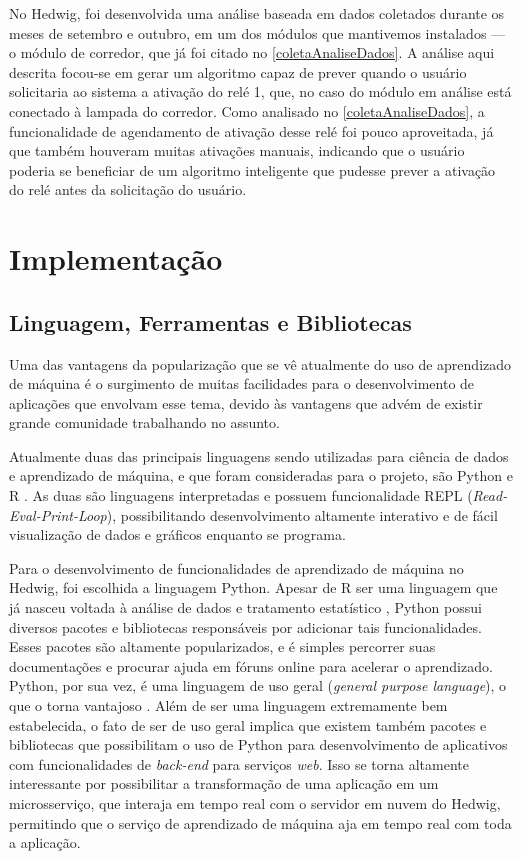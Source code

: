 		No Hedwig, foi desenvolvida uma análise baseada em dados coletados durante os meses de setembro e outubro, em um dos módulos que mantivemos instalados --- o módulo de corredor, que já foi citado no \ref{coletaAnaliseDados}. A análise aqui descrita focou-se em gerar um algoritmo capaz de prever quando o usuário solicitaria ao sistema a ativação do relé 1, que, no caso do módulo em análise está conectado à lampada do corredor. Como analisado no \ref{coletaAnaliseDados}, a funcionalidade de agendamento de ativação desse relé foi pouco aproveitada, já que também houveram muitas ativações manuais, indicando que o usuário poderia se beneficiar de um algoritmo inteligente que pudesse prever a ativação do relé antes da solicitação do usuário.

	\section{Implementação}

		\subsection{Linguagem, Ferramentas e Bibliotecas}

			Uma das vantagens da popularização que se vê atualmente do uso de aprendizado de máquina é o surgimento de muitas facilidades para o desenvolvimento de aplicações que envolvam esse tema, devido às vantagens que advém de existir grande comunidade trabalhando no assunto.

			Atualmente duas das principais linguagens sendo utilizadas para ciência de dados e aprendizado de máquina, e que foram consideradas para o projeto, são Python e R \cite{languagesForML}. As duas são linguagens interpretadas e possuem funcionalidade REPL (\emph{Read-Eval-Print-Loop}), possibilitando desenvolvimento altamente interativo e de fácil visualização de dados e gráficos enquanto se programa.

			Para o desenvolvimento de funcionalidades de aprendizado de máquina no Hedwig, foi escolhida a linguagem Python. Apesar de R ser uma linguagem que já nasceu voltada à análise de dados e tratamento estatístico \cite{rLanguage}, Python possui diversos pacotes e bibliotecas responsáveis por adicionar tais funcionalidades. Esses pacotes são altamente popularizados, e é simples percorrer suas documentações e procurar ajuda em fóruns online para acelerar o aprendizado. Python, por sua vez, é uma linguagem de uso geral (\emph{general purpose language}), o que o torna vantajoso \cite{pythonApplications}. Além de ser uma linguagem extremamente bem estabelecida, o fato de ser de uso geral implica que existem também pacotes e bibliotecas que possibilitam o uso de Python para desenvolvimento de aplicativos com funcionalidades de \emph{back-end} para serviços \emph{web}. Isso se torna altamente interessante por possibilitar a transformação de uma aplicação em um microsserviço, que interaja em tempo real com o servidor em nuvem do Hedwig, permitindo que o serviço de aprendizado de máquina aja em tempo real com toda a aplicação.

